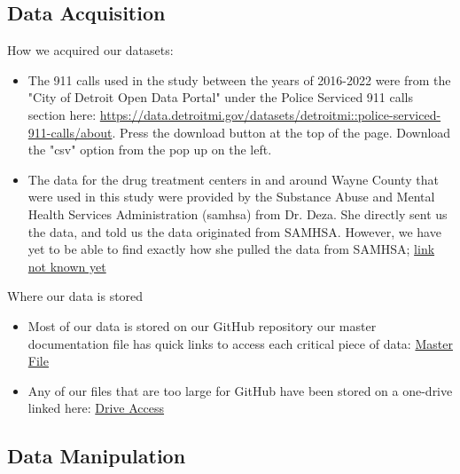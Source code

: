\documentclass[12pt]{article}
\begin{document}
\subsection{Data Acquisition}
\label{sec:theory}
How we acquired our datasets:
\begin{itemize}
    \item The 911 calls used in the study between the years of 2016-2022 were from the "City of Detroit Open Data Portal" under the Police Serviced 911 calls section here:
    \url{https://data.detroitmi.gov/datasets/detroitmi::police-serviced-911-calls/about}. Press the download button at the top of the page. Download the "csv" option from the pop up on the left.
    \item The data for the drug treatment centers in and around Wayne County that were used in this study were provided by the Substance Abuse and Mental Health Services Administration  (samhsa) from Dr. Deza. She directly sent us the data, and told us the data originated from SAMHSA. However, we have yet to be able to find exactly how she pulled the data from SAMHSA;
    \url{link not known yet}
\end{itemize}

\noindent Where our data is stored
\begin{itemize}
    \item Most of our data is stored on our GitHub repository our master documentation file has quick links to access each critical piece of data: \href{https://github.com/ecn310/course-project-zipcentercrime/blob/main/Master%20Documentation%20File.md}{Master File}
     \item Any of our files that are too large for GitHub have been stored on a one-drive linked here: \href{https://sumailsyr-my.sharepoint.com/:f:/r/personal/wrmaechl_syr_edu/Documents/ZipCenterCrime?csf=1&web=1&e=IK0GWY}{Drive Access}
\end{itemize}


\subsection{Data Manipulation}
\label{sec:data}
\end{document}
